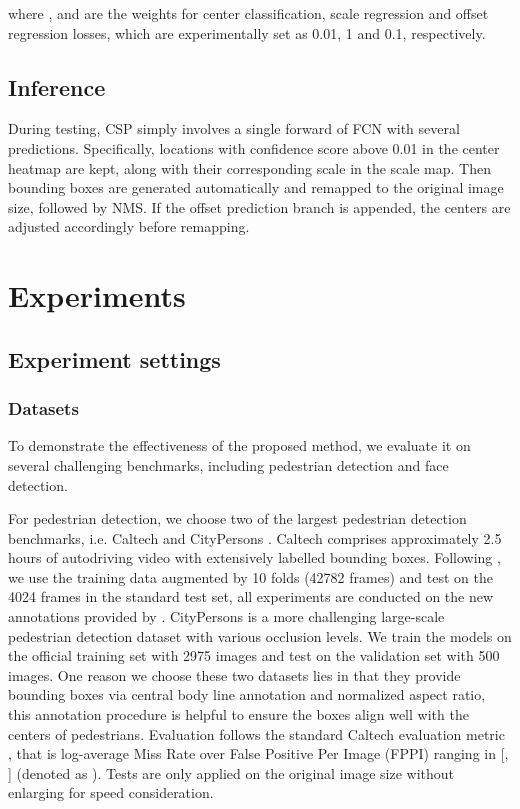 where ,  and  are the weights for center classification, scale regression and offset regression losses, which are experimentally set as 0.01, 1 and 0.1, respectively.

\subsection{Inference}
During testing, CSP simply involves a single forward of FCN with several predictions. Specifically, locations with confidence score above 0.01 in the center heatmap are kept, along with their corresponding scale in the scale map. Then bounding boxes are generated automatically and remapped to the original image size, followed by NMS. If the offset prediction branch is appended, the centers are adjusted accordingly before remapping.

\section{Experiments}
\subsection{Experiment settings}
\subsubsection{Datasets}
To demonstrate the effectiveness of the proposed method, we evaluate it on several challenging benchmarks, including pedestrian detection and face detection.

For pedestrian detection, we choose two of the largest pedestrian detection benchmarks, i.e. Caltech \cite{dollar2012pedestrian} and CityPersons \cite{zhang2017citypersons}.
Caltech comprises approximately 2.5 hours of autodriving
video with extensively labelled bounding boxes.
 Following \cite{zhang2017citypersons,mao2017can,wang2017repulsion,Liu_2018_ECCV,Zhang_2018_ECCV}, we use the training data augmented by 10 folds (42782 frames) and test on the 4024 frames in the standard test set, all experiments are conducted on the new annotations provided by \cite{zhang2016far}.
CityPersons is a more challenging large-scale pedestrian detection dataset with various occlusion levels. We train the models on the official training set with 2975 images and test on the validation set with 500 images.
One reason we choose these two datasets lies in that they provide bounding boxes via central body line annotation and normalized aspect ratio, this annotation procedure is helpful to ensure the boxes align well with the centers of pedestrians.
Evaluation follows the standard Caltech evaluation metric \cite{dollar2012pedestrian}, that is log-average Miss Rate over False Positive Per Image (FPPI) ranging in [, ] (denoted as ). Tests are only applied on the original image size without enlarging for speed consideration.

